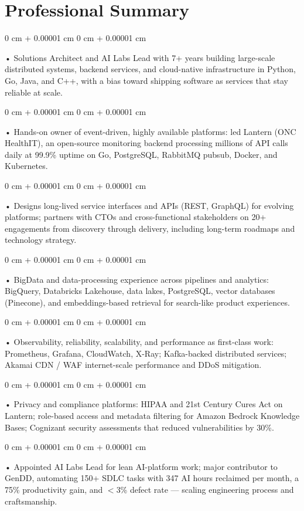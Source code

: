 \documentclass[10pt, letterpaper]{article}
\newenvironment{onecolentry}{
    \begin{adjustwidth}{
        0 cm + 0.00001 cm
    }{
        0 cm + 0.00001 cm
    }
}{
    \end{adjustwidth}
} %
\begin{document}
    \section{Professional Summary}
        \vspace{2 pt }
        \begin{onecolentry}
            • Solutions Architect and AI Labs Lead with 7+ years building large-scale distributed systems, backend services, and cloud-native infrastructure in Python, Go, Java, and C++, with a bias toward shipping software as services that stay reliable at scale.
        \end{onecolentry}
        \begin{onecolentry}
            • Hands-on owner of event-driven, highly available platforms: led Lantern (ONC HealthIT), an open-source monitoring backend processing millions of API calls daily at 99.9\% uptime on Go, PostgreSQL, RabbitMQ pubsub, Docker, and Kubernetes.
        \end{onecolentry}
        \begin{onecolentry}
            • Designs long-lived service interfaces and APIs (REST, GraphQL) for evolving platforms; partners with CTOs and cross-functional stakeholders on 20+ engagements from discovery through delivery, including long-term roadmaps and technology strategy.
        \end{onecolentry}
        \begin{onecolentry}
            • BigData and data-processing experience across pipelines and analytics: BigQuery, Databricks Lakehouse, data lakes, PostgreSQL, vector databases (Pinecone), and embeddings-based retrieval for search-like product experiences.
        \end{onecolentry}
        \begin{onecolentry}
            • Observability, reliability, scalability, and performance as first-class work: Prometheus, Grafana, CloudWatch, X-Ray; Kafka-backed distributed services; Akamai CDN / WAF internet-scale performance and DDoS mitigation.
        \end{onecolentry}
        \begin{onecolentry}
            • Privacy and compliance platforms: HIPAA and 21st Century Cures Act on Lantern; role-based access and metadata filtering for Amazon Bedrock Knowledge Bases; Cognizant security assessments that reduced vulnerabilities by 30\%.
        \end{onecolentry}
        \begin{onecolentry}
            • Appointed AI Labs Lead for lean AI-platform work; major contributor to GenDD, automating 150+ SDLC tasks with 347 AI hours reclaimed per month, a 75\% productivity gain, and $<$3\% defect rate --- scaling engineering process and craftsmanship.
        \end{onecolentry}
\end{document}
